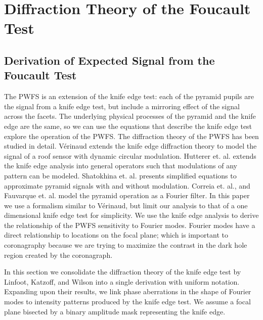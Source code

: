 \section{Diffraction Theory of the Foucault Test}\label{diffraction}
\subsection{Derivation of Expected Signal from the Foucault Test}
  The PWFS is an extension of the knife edge test: each of the pyramid pupils are the signal from a knife edge test, but include a mirroring effect of the signal across the facets. The underlying physical processes of the pyramid and the knife edge are the same, so we can use the equations that describe the knife edge test explore the operation of the PWFS. The diffraction theory of the PWFS has been studied in detail. Vérinaud\cite{verinaud2004nature} extends the knife edge diffraction theory to model the signal of a roof sensor with dynamic circular modulation. Hutterer et. al.\cite{hutterer2019real} extends the knife edge analysis into general operators such that modulations of any pattern can be modeled. Shatokhina et. al.\cite{shatokhina2014fast} presents simplified equations to approximate pyramid signals with and without modulation. Correia et. al.\cite{correia2020performance}, and Fauvarque et. al.\cite{fauvarque2019kernel} model the pyramid operation as a Fourier filter. In this paper we use a formalism similar to Vérinaud, but limit our analysis to that of a one dimensional knife edge test for simplicity. We use the knife edge analysis to derive the relationship of the PWFS sensitivity to Fourier modes. Fourier modes have a direct relationship to locations on the focal plane; which is important to coronagraphy because we are trying to maximize the contrast in the dark hole region created by the coronagraph.
 
 In this section we consolidate the diffraction theory of the knife edge test by Linfoot\cite{linfoot1948theory}, Katzoff\cite{katzoff1971quantitative}, and Wilson\cite{wilson1975wavefront} into a single derivation with uniform notation. Expanding upon their results, we link phase aberrations in the shape of Fourier modes to intensity patterns produced by the knife edge test. We assume a focal plane bisected by a binary amplitude mask representing the knife edge. 
 

